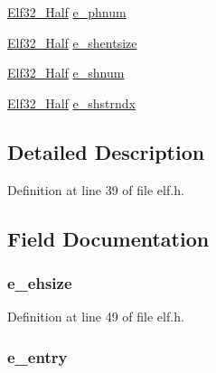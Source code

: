 \begin{DoxyCompactItemize}
\item 
\hyperlink{elf_8h_a2ff0787d7d1bae0f251192806a2974ca}{Elf32\-\_\-\-Half} \hyperlink{struct_elf32___ehdr_a51ddda24560032b209311eb32528a249}{e\-\_\-phnum}
\item 
\hyperlink{elf_8h_a2ff0787d7d1bae0f251192806a2974ca}{Elf32\-\_\-\-Half} \hyperlink{struct_elf32___ehdr_a8019991b37b5c2f1e1dd599627b07884}{e\-\_\-shentsize}
\item 
\hyperlink{elf_8h_a2ff0787d7d1bae0f251192806a2974ca}{Elf32\-\_\-\-Half} \hyperlink{struct_elf32___ehdr_a42978053163eaa3a3a6b828ca72a7268}{e\-\_\-shnum}
\item 
\hyperlink{elf_8h_a2ff0787d7d1bae0f251192806a2974ca}{Elf32\-\_\-\-Half} \hyperlink{struct_elf32___ehdr_a70716c059a9a377dd31b958722f5e947}{e\-\_\-shstrndx}
\end{DoxyCompactItemize}


\subsection{Detailed Description}


Definition at line 39 of file elf.\-h.



\subsection{Field Documentation}
\hypertarget{struct_elf32___ehdr_aa0fef16d9e9b4c56c6449fe6e5e43571}{
\subsubsection[{e\-\_\-ehsize}]{ e\-\_\-ehsize}}\label{struct_elf32___ehdr_aa0fef16d9e9b4c56c6449fe6e5e43571}


Definition at line 49 of file elf.\-h.

\hypertarget{struct_elf32___ehdr_a146e750d8c5ddfa36d84e83fd43a9828}{
\subsubsection[{e\-\_\-entry}]{ e\-\_\-entry}}\label{struct_elf32___ehdr_a146e750d8c5ddfa36d84e83fd43a9828}


